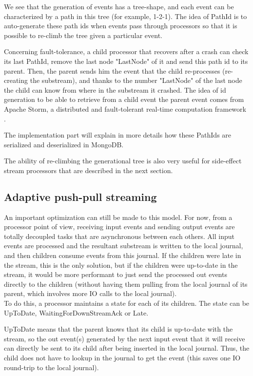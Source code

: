 We see that the generation of events has a tree-shape, and each event can be characterized by a path in this tree (for example, 1-2-1). The idea of PathId is to
auto-generate these path ids when events pass through processors so that it is possible to re-climb the tree given a particular event.

Concerning fault-tolerance, a child processor that recovers after a crash can check its last PathId, remove the last node "LastNode" of it and send this path id to its parent. Then, the parent sends him the event that the child re-processes (re-creating the substream), and thanks to the number "LastNode" of the last node the child can know from where in the substream it crashed. The idea of id generation to be able to retrieve from a child event the parent event comes from Apache Storm, a distributed and fault-tolerant real-time computation framework .

The implementation part will explain in more details how these PathIds are serialized and deserialized in MongoDB.

The ability of re-climbing the generational tree is also very useful for side-effect stream processors that are described in the next section.

\subsection{Adaptive push-pull streaming}
\label{sec:adapativepushpull}

An important optimization can still be made to this model. For now, from a processor point of view, receiving input events and sending output events are totally
decoupled tasks that are asynchronous between each others. All input events are processed and the resultant substream is written to the local journal, and then children consume events from this journal. 
If the children were late in the stream, this is the only solution, but if the children were up-to-date in the stream, it would be more performant to just send the processed out events directly to the children (without having them pulling from the local journal of its parent, which involves more IO calls to the local journal).
\\

To do this, a processor maintains a state for each of its children. The state can be UpToDate, WaitingForDownStreamAck or Late.

UpToDate means that the parent knows that its child is up-to-date with the stream, so the out event(s) generated by the next input event that it will receive can 
directly be sent to its child after being inserted in the local journal. Thus, the child does not have to lookup in the journal to get the event (this saves one IO round-trip to the local journal).

